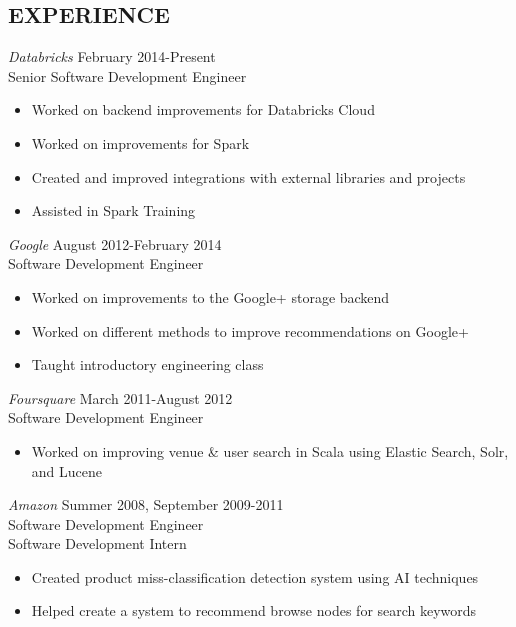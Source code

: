 \documentclass[10pt,line,margin=0.1]{newsres}
\begin{document}
\begin{resume}
\section{EXPERIENCE}
        {\sl Databricks} \hfill February 2014-Present\\
        Senior Software Development Engineer
        \begin{itemize}  \itemsep -2pt %
          \item Worked on backend improvements for Databricks Cloud
          \item Worked on improvements for Spark
          \item Created and improved integrations with external libraries and projects
          \item Assisted in Spark Training
        \end{itemize}
        {\sl Google} \hfill August 2012-February 2014\\
        Software Development Engineer
        \begin{itemize}  \itemsep -2pt %
          \item Worked on improvements to the Google+ storage backend
          \item Worked on different methods to improve recommendations on Google+
          \item Taught introductory engineering class
        \end{itemize}
        {\sl Foursquare} \hfill March 2011-August 2012\\
        Software Development Engineer
        \begin{itemize}  \itemsep -2pt %
        \item Worked on improving venue \& user search in Scala using Elastic Search, Solr, and Lucene
        \end{itemize}
                {\sl Amazon} \hfill            Summer 2008, September 2009-2011 \\
                Software Development Engineer \\
                Software Development Intern
                \begin{itemize}  \itemsep -2pt %
                \item Created product miss-classification detection system using AI techniques
                \item Helped create a system to recommend browse nodes for search keywords

\end{itemize}
\end{resume}
\end{document}
